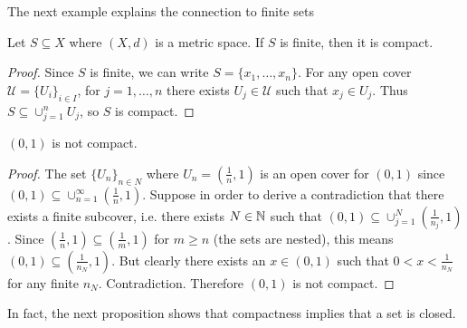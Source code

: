 \documentclass{article}
\begin{document}
The next example explains the connection to finite sets

\begin{example}
Let $S\subseteq X$ where $(X,d)$ is a metric space. If $S$ is finite, then it is compact. 
\end{example}
\begin{proof}
Since $S$ is finite, we can write $S = \{ x_1, \ldots, x_n\}$. For any open cover $\mathcal{U} = \{ U_i \}_{i\in I}$, for $j=1,\ldots,n$ there exists $U_j \in \mathcal{U}$ such that $x_j \in U_j$. Thus $S \subseteq \cup_{j=1}^n U_j$, so $S$ is compact.
\end{proof}

\begin{example}
$(0,1)$ is not compact.
\end{example}
\begin{proof}
The set $\{U_n\}_{n \in N}$ where $U_n = \left(\frac{1}{n},1\right)$ is an open cover for $(0,1)$ since $(0,1) \subseteq \cup_{n=1}^\infty \left(\frac{1}{n},1\right)$. Suppose in order to derive a contradiction that there exists a finite subcover, i.e. there exists $N \in {\mathbb{N}}$ such that $(0,1) \subseteq \cup_{j=1}^N \left(\frac{1}{n_j},1\right)$. Since $\left(\frac{1}{n},1\right) \subseteq \left(\frac{1}{m},1\right)$ for $m \geq n$ (the sets are nested), this means $(0,1) \subseteq  \left(\frac{1}{n_N},1\right)$. But clearly there exists an $x \in (0,1)$ such that $0 < x < \frac{1}{n_N}$ for any finite $n_N$. Contradiction. Therefore $(0,1)$ is not compact.
\end{proof}

In fact, the next proposition shows that compactness implies that a set is closed.
\end{document}
